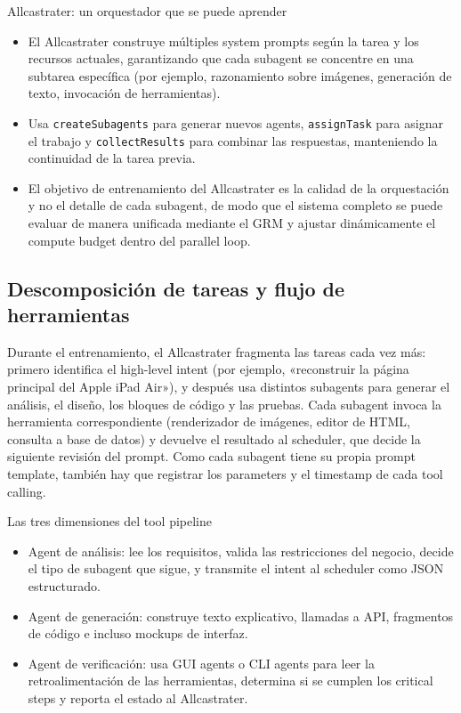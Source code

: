 \documentclass[a4paper]{article}
\begin{document}
\begin{knowledgebox}{Allcastrater: un orquestador que se puede aprender}
\begin{itemize}
    \item El Allcastrater construye múltiples system prompts según la tarea y los recursos actuales, garantizando que cada subagent se concentre en una subtarea específica (por ejemplo, razonamiento sobre imágenes, generación de texto, invocación de herramientas).
    \item Usa \texttt{createSubagents} para generar nuevos agents, \texttt{assignTask} para asignar el trabajo y \texttt{collectResults} para combinar las respuestas, manteniendo la continuidad de la tarea previa.
    \item El objetivo de entrenamiento del Allcastrater es la calidad de la orquestación y no el detalle de cada subagent, de modo que el sistema completo se puede evaluar de manera unificada mediante el GRM y ajustar dinámicamente el compute budget dentro del parallel loop.
\end{itemize}
\end{knowledgebox}

\subsection{Descomposición de tareas y flujo de herramientas}
Durante el entrenamiento, el Allcastrater fragmenta las tareas cada vez más: primero identifica el high-level intent (por ejemplo, «reconstruir la página principal del Apple iPad Air»), y después usa distintos subagents para generar el análisis, el diseño, los bloques de código y las pruebas. Cada subagent invoca la herramienta correspondiente (renderizador de imágenes, editor de HTML, consulta a base de datos) y devuelve el resultado al scheduler, que decide la siguiente revisión del prompt. Como cada subagent tiene su propia prompt template, también hay que registrar los parameters y el timestamp de cada tool calling.

\begin{knowledgebox}{Las tres dimensiones del tool pipeline}
\begin{itemize}
    \item Agent de análisis: lee los requisitos, valida las restricciones del negocio, decide el tipo de subagent que sigue, y transmite el intent al scheduler como JSON estructurado.
    \item Agent de generación: construye texto explicativo, llamadas a API, fragmentos de código e incluso mockups de interfaz.
    \item Agent de verificación: usa GUI agents o CLI agents para leer la retroalimentación de las herramientas, determina si se cumplen los critical steps y reporta el estado al Allcastrater.
\end{itemize}
\end{knowledgebox}
\end{document}
